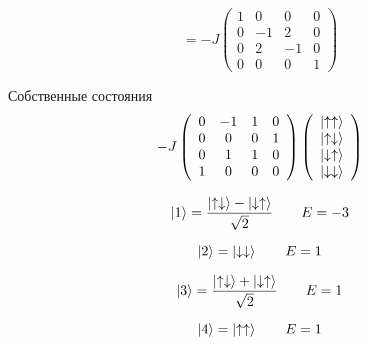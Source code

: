 \begin{solution}
 $$= -J\left(\begin{array}{cccc}{1} & {0} & {0} & {0} \\ {0} & {-1} & {2} & {0} \\ {0} & {2} & {-1} & {0} \\ {0} & {0} & {0} & {1}\end{array}\right)
 $$

Собственные состояния $$
-J\left(\begin{array}{cccc}{0} & {-1} & {1} & {0} \\ {0} & {0} & {0} & {1} \\ {0} & {1} & {1} & {0} \\ {1} & {0} & {0} & {0}\end{array}\right) \left(\begin{array}{l}\ket{\uparrow \uparrow} \\ \ket{\uparrow \downarrow} \\ \ket{\downarrow \uparrow} \\ \ket{\downarrow \downarrow} \end{array}\right)
$$

$$
\ket{1}=\frac{\ket{\uparrow\downarrow}-\ket{\downarrow\uparrow}}{\sqrt{2}} \qquad E = -3
$$

$$
\ket{2}=\ket{\downarrow\downarrow}\qquad E=1
$$

$$
\ket{3}=\frac{\ket{\uparrow\downarrow}+\ket{\downarrow\uparrow}}{\sqrt{2}}\qquad E=1
$$

$$
\ket{4}=\ket{\uparrow\uparrow}\qquad E=1
$$
	
\end{solution}























